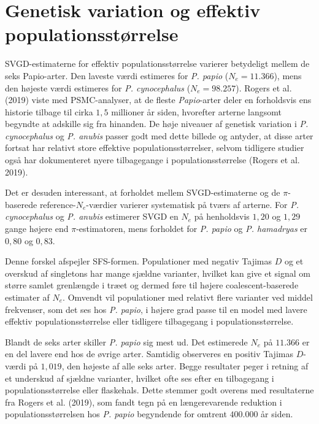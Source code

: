 \documentclass[
  10pt,
  a4paper,
]{scrbook}
\let\oldemph\emph
\renewcommand\emph[1]{\oldemph{\color{gray}#1}}
\begin{document}
\section{Genetisk variation og effektiv
populationsstørrelse}\label{genetisk-variation-og-effektiv-populationsstuxf8rrelse}

SVGD-estimaterne for effektiv populationsstørrelse varierer betydeligt
mellem de seks Papio-arter. Den laveste værdi estimeres for \emph{P.
papio} (\(N_e = 11.366\)), mens den højeste værdi estimeres for \emph{P.
cynocephalus} (\(N_e = 98.257\)). {Rogers et al.} (2019) viste med
PSMC-analyser, at de fleste \emph{Papio}-arter deler en forholdsvis ens
historie tilbage til cirka \(1{,}5\) millioner år siden, hvorefter
arterne langsomt begyndte at adskille sig fra hinanden. De høje niveauer
af genetisk variation i \emph{P. cynocephalus} og \emph{P. anubis}
passer godt med dette billede og antyder, at disse arter fortsat har
relativt store effektive populationsstørrelser, selvom tidligere studier
også har dokumenteret nyere tilbagegange i populationsstørrelse ({Rogers
et al.} 2019).

Det er desuden interessant, at forholdet mellem SVGD-estimaterne og de
\(\pi\)-baserede reference-\(N_e\)-værdier varierer systematisk på tværs
af arterne. For \emph{P. cynocephalus} og \emph{P. anubis} estimerer
SVGD en \(N_e\) på henholdsvis \(1{,}20\) og \(1{,}29\) gange højere end
\(\pi\)-estimatoren, mens forholdet for \emph{P. papio} og \emph{P.
hamadryas} er \(0{,}80\) og \(0{,}83\).

Denne forskel afspejler SFS-formen. Populationer med negativ Tajimas
\(D\) og et overskud af singletons har mange sjældne varianter, hvilket
kan give et signal om større samlet grenlængde i træet og dermed føre
til højere coalescent-baserede estimater af \(N_e\). Omvendt vil
populationer med relativt flere varianter ved middel frekvenser, som det
ses hos \emph{P. papio}, i højere grad passe til en model med lavere
effektiv populationsstørrelse eller tidligere tilbagegang i
populationsstørrelse.

Blandt de seks arter skiller \emph{P. papio} sig mest ud. Det estimerede
\(N_e\) på \(11.366\) er en del lavere end hos de øvrige arter. Samtidig
observeres en positiv Tajimas \(D\)-værdi på \(1{,}019\), den højeste af
alle seks arter. Begge resultater peger i retning af et underskud af
sjældne varianter, hvilket ofte ses efter en tilbagegang i
populationsstørrelse eller flaskehals. Dette stemmer godt overens med
resultaterne fra {Rogers et al.} (2019), som fandt tegn på en
længerevarende reduktion i populationsstørrelsen hos \emph{P. papio}
begyndende for omtrent \(400.000\) år siden.
\end{document}
